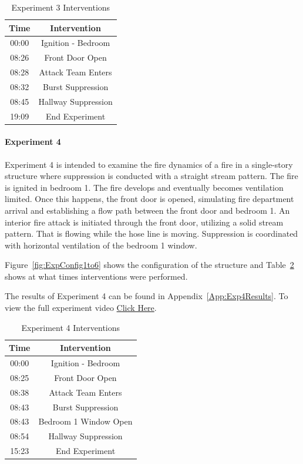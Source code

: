 \documentclass[12pt,oneside]{book}
\begin{document}
\begin{table}[H]
	\centering
	\caption{Experiment 3 Interventions}
	\begin{tabular}{|c|c|} 
		\hline
		Time & Intervention \\ \hline \hline
		00:00 & Ignition - Bedroom \\ \hline
		08:26 & Front Door Open \\ \hline
		08:28 & Attack Team Enters\\ \hline
		08:32 & Burst Suppression \\ \hline 
		08:45 & Hallway Suppression \\ \hline
		19:09 & End Experiment\\ \hline
	\end{tabular}
	\label{Table:Exp3Interventions}
\end{table}

\clearpage

\paragraph{Experiment 4} \mbox{}

Experiment 4 is intended to examine the fire dynamics of a fire in a single-story structure where suppression is conducted with a straight stream pattern. The fire is ignited in bedroom 1. The fire develops and eventually becomes ventilation limited. Once this happens, the front door is opened, simulating fire department arrival and establishing a flow path between the front door and bedroom 1. An interior fire attack is initiated through the front door, utilizing a solid stream pattern. That is flowing while the hose line is moving. Suppression is coordinated with horizontal ventilation of the bedroom 1 window. 

Figure~\ref{fig:ExpConfig1to6} shows the configuration of the structure and Table~\ref{Table:Exp4Interventions} shows at what times interventions were performed. 

The results of Experiment 4 can be found in Appendix~\ref{App:Exp4Results}. To view the full experiment video \href{https://youtu.be/gl8rc1Nsl1k}{Click Here}.

\begin{table}[H]
	\centering
	\caption{Experiment 4 Interventions}
	\begin{tabular}{|c|c|} 
		\hline
		Time & Intervention \\ \hline \hline
		00:00 & Ignition - Bedroom \\ \hline
		08:25 & Front Door Open \\ \hline
		08:38 & Attack Team Enters\\ \hline
		08:43 & Burst Suppression \\ \hline
		08:43 & Bedroom 1 Window Open \\ \hline 
		08:54 & Hallway Suppression \\ \hline
		15:23 & End Experiment\\ \hline
	\end{tabular}
	\label{Table:Exp4Interventions}
\end{table}
\end{document}
